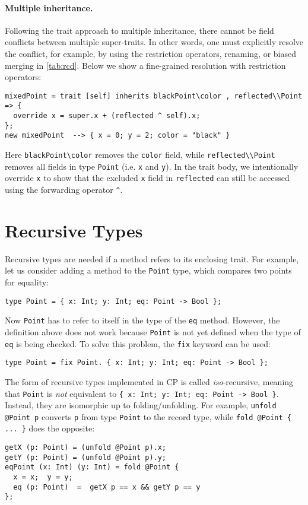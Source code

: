 \paragraph{Multiple inheritance.}
Following the trait approach to multiple inheritance, there cannot be field
conflicts between multiple super-traits. In other words, one must explicitly
resolve the conflict, for example, by using the restriction operators, renaming,
or biased merging in \autoref{tab:rcd}. Below we show a fine-grained resolution
with restriction operators:
\begin{lstlisting}
mixedPoint = trait [self] inherits blackPoint\color , reflected\\Point => {
  override x = super.x + (reflected ^ self).x;
};
new mixedPoint  --> { x = 0; y = 2; color = "black" }
\end{lstlisting}
Here \lstinline{blackPoint\color} removes the \lstinline{color} field, while
\lstinline{reflected\\Point} removes all fields in type \lstinline{Point} (i.e.
\lstinline{x} and \lstinline{y}). In the trait body, we intentionally override
\lstinline{x} to show that the excluded \lstinline{x} field in
\lstinline{reflected} can still be accessed using the forwarding operator
\lstinline{^}.

\section{Recursive Types}

Recursive types are needed if a method refers to its enclosing trait. For
example, let us consider adding a method to the \lstinline{Point} type, which
compares two points for equality:
\begin{lstlisting}
type Point = { x: Int; y: Int; eq: Point -> Bool };
\end{lstlisting}
Now \lstinline{Point} has to refer to itself in the type of the \lstinline{eq}
method. However, the definition above does not work because \lstinline{Point} is
not yet defined when the type of \lstinline{eq} is being checked. To solve this
problem, the \lstinline{fix} keyword can be used:
\begin{lstlisting}
type Point = fix Point. { x: Int; y: Int; eq: Point -> Bool };
\end{lstlisting}
The form of recursive types implemented in CP is called \emph{iso}-recursive,
meaning that \lstinline{Point} is \emph{not} equivalent to
\lstinline|{ x: Int; y: Int; eq: Point -> Bool }|. Instead, they are isomorphic
up to folding/unfolding. For example, \lstinline{unfold @Point p} converts
\lstinline{p} from type \lstinline{Point} to the record type, while
\lstinline|fold @Point { ... }| does the opposite:
\begin{lstlisting}
getX (p: Point) = (unfold @Point p).x;
getY (p: Point) = (unfold @Point p).y;
eqPoint (x: Int) (y: Int) = fold @Point {
  x = x;  y = y;
  eq (p: Point)  =  getX p == x && getY p == y
};
\end{lstlisting}

